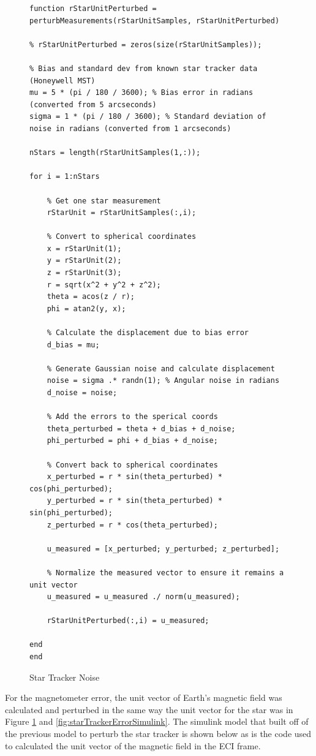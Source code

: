 \begin{figure} [H]
    \centering
    \begin{lstlisting}
function rStarUnitPerturbed = perturbMeasurements(rStarUnitSamples, rStarUnitPerturbed)

% rStarUnitPerturbed = zeros(size(rStarUnitSamples));

% Bias and standard dev from known star tracker data (Honeywell MST)
mu = 5 * (pi / 180 / 3600); % Bias error in radians (converted from 5 arcseconds)
sigma = 1 * (pi / 180 / 3600); % Standard deviation of noise in radians (converted from 1 arcseconds)

nStars = length(rStarUnitSamples(1,:));

for i = 1:nStars

    % Get one star measurement
    rStarUnit = rStarUnitSamples(:,i);

    % Convert to spherical coordinates
    x = rStarUnit(1);
    y = rStarUnit(2); 
    z = rStarUnit(3);
    r = sqrt(x^2 + y^2 + z^2);
    theta = acos(z / r);
    phi = atan2(y, x);
    
    % Calculate the displacement due to bias error
    d_bias = mu;
    
    % Generate Gaussian noise and calculate displacement
    noise = sigma .* randn(1); % Angular noise in radians
    d_noise = noise;
    
    % Add the errors to the sperical coords
    theta_perturbed = theta + d_bias + d_noise;
    phi_perturbed = phi + d_bias + d_noise;
    
    % Convert back to spherical coordinates
    x_perturbed = r * sin(theta_perturbed) * cos(phi_perturbed);
    y_perturbed = r * sin(theta_perturbed) * sin(phi_perturbed);
    z_perturbed = r * cos(theta_perturbed);
    
    u_measured = [x_perturbed; y_perturbed; z_perturbed];
    
    % Normalize the measured vector to ensure it remains a unit vector
    u_measured = u_measured ./ norm(u_measured);

    rStarUnitPerturbed(:,i) = u_measured;
    
end
end
    \end{lstlisting}
    \caption{Star Tracker Noise}
    \label{fig:starTrackerNoise}
\end{figure}

For the magnetometer error, the unit vector of Earth's magnetic field was calculated and perturbed in the same way the unit vector for the star was in Figure \ref{fig:starTrackerNoise} and \ref{fig:starTrackerErrorSimulink}. The simulink model that built off of the previous model to perturb the star tracker is shown below as is the code used to calculated the unit vector of the magnetic field in the ECI frame.

